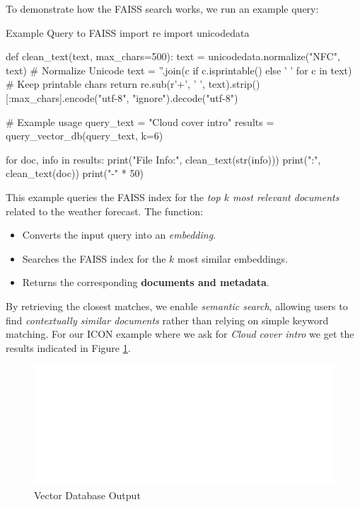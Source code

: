 To demonstrate how the FAISS search works, we run an example query:

\begin{codeonly}{Example Query to FAISS}
import re
import unicodedata

def clean_text(text, max_chars=500):
    text = unicodedata.normalize("NFC", text)  # Normalize Unicode
    text = ''.join(c if c.isprintable() else ' ' for c in text)  # Keep printable chars
    return re.sub(r'\s+', ' ', text).strip()[:max_chars].encode("utf-8", "ignore").decode("utf-8")

# Example usage
query_text = "Cloud cover intro"
results = query_vector_db(query_text, k=6)

for doc, info in results: 
    print("File Info:", clean_text(str(info)))
    print("\nDocument:", clean_text(doc))
    print("-" * 50)
\end{codeonly}

This example queries the FAISS index for the {\em top $k$ most relevant documents} related to the weather forecast. The function:
\begin{itemize}
    \item Converts the input query into an {\em embedding}.
    \item Searches the FAISS index for the \( k \) most similar embeddings.
    \item Returns the corresponding {\bf documents and metadata}.
\end{itemize}

By retrieving the closest matches, we enable {\em semantic search}, allowing users to find {\em contextually similar documents} rather than relying on simple keyword matching. For our ICON example where we ask for {\em Cloud cover intro} we get the results indicated in Figure \ref{fig:vectordb_out}.  

\begin{figure}[ht]
    \centering
    \includegraphics[width=\textwidth]{images/vectordb_out3.pdf}
    \caption{Vector Database Output}
    \label{fig:vectordb_out}
\end{figure}


